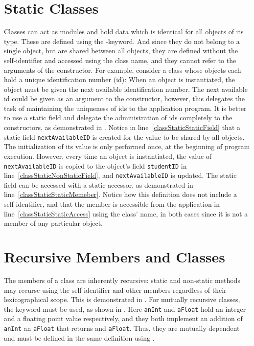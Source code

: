 \section{Static Classes}
Classes can act as modules and hold data which is identical for all objects of its type. These are defined using the -keyword. And since they do not belong to a single object, but are shared between all objects, they are defined without the self-identifier and accessed using the class name, and they cannot refer to the arguments of the constructor. For example, consider a class whose objects each hold a unique identification number (id): When an object is instantiated, the object must be given the next available identification number. The next available id could be given as an argument to the constructor, however, this delegates the task of maintaining the uniqueness of ids to the application program. It is better to use a static field and delegate the administration of ids completely to the constructors, as demonstrated in .
%
%
Notice in line~\ref{classStaticStaticField} that a static field \lstinline{nextAvailableID} is created for the value to be shared by all objects. The initialization of its value is only performed once, at the beginning of program execution. However, every time an object is instantiated, the value of \lstinline{nextAvailableID} is copied to the object's field \lstinline{studentID} in line~\ref{classStaticNonStaticField}, and \lstinline{nextAvailableID} is updated. The static field can be accessed with a static accessor, as demonstrated in line~\ref{classStaticStaticMemeber}. Notice how this definition does not include a self-identifier, and that the member is accessible from the application in line~\ref{classStaticStaticAccess} using the class' name, in both cases since it is not a member of any particular object.

\section{Recursive Members and Classes}
The members of a class are inherently recursive: static and non-static methods may recurse using the self identifier and other members regardless of their lexicographical scope. This is demonstrated in .
%
%
For mutually recursive classes, the keyword  must be used, as shown in .
%
%
Here \lstinline{anInt} and \lstinline{aFloat} hold an integer and a floating point value respectively, and they both implement an addition of \lstinline{anInt} an \lstinline{aFloat} that returns and \lstinline{aFloat}. Thus, they are mutually dependent and must be defined in the same  definition using .

